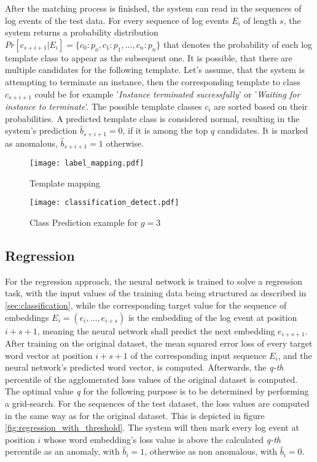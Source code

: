 After the matching process is finished, the system can read in the sequences of log events of the test data. For every sequence of log events $E_i$ of length $s$, the system returns a probability distribution $Pr[c_{s+i+1}|E_i] = \{c_0 : p_o, c_1 : p_1, ..., c_n : p_n\}$ that denotes the probability of each log template class to appear as the subsequent one. It is possible, that there are multiple candidates for the following template. Let's assume, that the system is attempting to terminate an instance, then the corresponding template to class $c_{s+i+1}$ could be for example '\textit{Instance terminated successfully}' or '\textit{Waiting for instance to terminate}'. The possible template classes $c_i$ are sorted based on their probabilities. A predicted template class is considered normal, resulting in the system's prediction $\hat{b}_{s+i+1}=0$, if it is among the top $q$ candidates. It is marked as anomalous, $\hat{b}_{s+i+1}=1$ otherwise.
 

\begin{figure}[H]
	\centering
	\captionsetup{justification=centering}
	\texttt{[image: label\_mapping.pdf]}
	\caption{Template mapping}
	\label{fig:label_mapping}
\end{figure}

\begin{figure}[H]
	\centering	
	\texttt{[image: classification\_detect.pdf]}
	\caption{Class Prediction example for $g=3$}
	\label{fig:class_prediction}
\end{figure}
\newpage
\subsection{Regression \label{sec:regression}}
For the regression approach, the neural network is trained to solve a regression task, with the input values of the training data being structured as described in \ref{sec:classification}, while the corresponding target value for the sequence of embeddings $E_i = (e_i, ..., e_{i+s})$ is the embedding of the log event at position $i+s+1$, meaning the neural network shall predict the next embedding $e_{i+s+1}$. After training on the original dataset, the mean squared error loss of every target word vector at position $i+s+1$ of the corresponding input sequence $E_i$, and the neural network's predicted word vector, is computed. Afterwards, the \textit{q-th} percentile of the agglomerated loss values of the original dataset is computed. The optimal value \textit{q} for the following purpose is to be determined by performing a grid-search. For the sequences of the test dataset, the loss values are computed in the same way as for the original dataset. This is depicted in figure \ref{fig:regression_with_threshold}. The system will then mark every log event at position $i$ whose word embedding's loss value is above the calculated \textit{q-th} percentile as an anomaly, with $\hat{b}_i=1$, otherwise as non anomalous, with $\hat{b}_i=0$.

